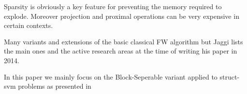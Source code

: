 Sparsity is obviously a key feature for preventing the memory required to
explode. Moreover projection and proximal operations can be very expensive in
certain contexts. %

Many variants and extensions of the basic classical FW algorithm
but Jaggi lists the main ones and the active research areas
at the time of writing his paper in 2014. %

In this paper we mainly focus on the Block-Seperable variant
applied to struct-svm problems as presented in 
\citet{lacoste-julienBlockCoordinateFrankWolfeOptimization2013}